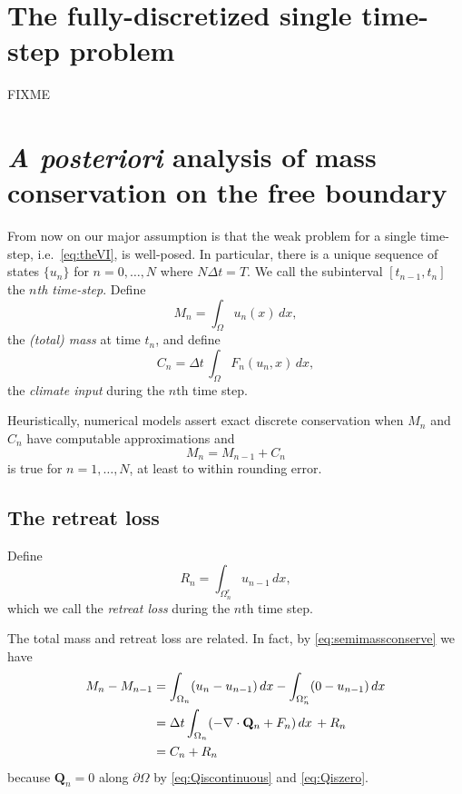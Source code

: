 \documentclass[final,leqno,onefignum,onetabnum]{siamltex1213bueler}
\newcommand\bQ{\mathbf{Q}}
\newcommand{\Div}{\nabla\cdot}
\begin{document}
\section{The fully-discretized single time-step problem}  \label{sec:spacediscretized} FIXME


\section{\emph{A posteriori} analysis of mass conservation on the free boundary}  \label{sec:timeseries}

From now on our major assumption is that the weak problem for a single time-step, i.e.~\eqref{eq:theVI}, is well-posed.  In particular, there is a unique sequence of states $\{u_n\}$ for $n=0,\dots,N$ where $N\Delta t = T$.  We call the subinterval $[t_{n-1},t_n]$ the \emph{$n$th time-step}.  Define
\begin{equation}
M_n = \int_\Omega u_n(x)\,dx, \label{eq:totalmassseries}
\end{equation}
the \emph{(total) mass} at time $t_n$, and define
\begin{equation}
C_n = \Delta t\, \int_\Omega F_n(u_n,x)\,dx, \label{eq:climateseries}
\end{equation}
the \emph{climate input} during the $n$th time step.

Heuristically, numerical models assert exact discrete conservation when $M_n$ and $C_n$ have computable approximations and
	$$M_n = M_{n-1} + C_n$$
is true for $n=1,\dots,N$, at least to within rounding error.

\subsection{The retreat loss}  \label{subsec:retreatloss}  Define
\begin{equation}
R_n = \int_{\Omega_n^r} u_{n-1}\,dx, \label{eq:retreatlossseries}
\end{equation}
which we call the \emph{retreat loss} during the $n$th time step.

The total mass and retreat loss are related.  In fact, by \eqref{eq:semimassconserve} we have
\begin{align}
M_n - M_{n-1} &= \int_{\Omega_n} (u_n - u_{n-1})\,dx - \int_{\Omega_n^r} (0 - u_{n-1})\,dx \label{eq:massstep} \\
   &= \Delta t \int_{\Omega_n} (- \Div \bQ_n + F_n) \,dx \, + R_n \notag \\
   &= C_n + R_n \notag
\end{align}
because $\bQ_n=0$ along $\partial \Omega$ by \eqref{eq:Qiscontinuous} and \eqref{eq:Qiszero}.
\end{document}
